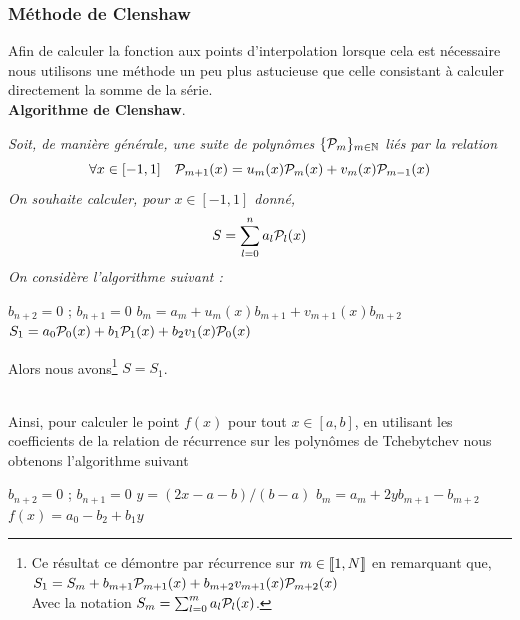 \documentclass[10pt]{article}
\begin{document}
\begin{multicols}{2}
\subsubsection{Méthode de Clenshaw}


Afin de calculer la fonction aux points d'interpolation lorsque cela est nécessaire nous utilisons une méthode un peu plus astucieuse que celle consistant à calculer directement la somme de la série. \\

\noindent
\textbf{Algorithme de Clenshaw}. {\itshape
Soit, de manière générale, une suite de polynômes $\{\mathcal{P}_m\}_{m \in \mathbb{N}}$ liés par la relation
\begin{equation}
  \forall x \in [-1, 1] \quad \mathcal{P}_{m+1}(x) = u_m(x)\mathcal{P}_m(x) + v_m(x)\mathcal{P}_{m-1}(x)
\end{equation}
On souhaite calculer, pour $x \in [-1, 1]$ donné, 
\begin{equation}
  S = \sum_{l=0}^{n} a_l \mathcal{P}_l(x)
\end{equation}
On considère l'algorithme suivant :
\vspace*{-11pt}
\begin{algorithm}[H]
  \begin{algorithmic}[1]
    \STATE $b_{n+2} = 0$ ; $b_{n+1} = 0$
    \STATE $b_m = a_m + u_m(x)b_{m+1} + v_{m+1}(x)b_{m+2}$
    \ENDFOR
    \STATE $S_1 = a_0\mathcal{P}_0(x) + b_1\mathcal{P}_1(x) + b_2v_1(x)\mathcal{P}_0(x)$
  \end{algorithmic}
\end{algorithm}
\vspace*{-11pt}
\noindent
Alors nous avons\footnote{Ce résultat ce démontre par récurrence sur $m \in  \llbracket 1,N \rrbracket $ en remarquant que,
$S_1 = S_m +  b_{m+1}\mathcal{P}_{m+1}(x) + b_{m+2}v_{m+1}(x)\mathcal{P}_{m+2}(x)$\\
Avec la notation $S_m = \sum_{l=0}^{m} a_l \mathcal{P}_l(x)$.} $S = S_1$. 
} \\

Ainsi, pour calculer le point $f(x)$ pour tout $x \in [a,b]$, en utilisant les coefficients de la relation de récurrence sur les polynômes de Tchebytchev  nous obtenons l'algorithme suivant 

\begin{algorithm}[H]
  \begin{algorithmic}[1]
    \STATE $b_{n+2} = 0$ ; $b_{n+1} = 0$
    \STATE $y = (2x-a-b)/(b-a)$
    \STATE $b_m = a_m + 2yb_{m+1} - b_{m+2}$
    \ENDFOR
    \STATE $f(x) = a_0 - b_2 + b_1y$
  \end{algorithmic}
\end{algorithm}


\end{multicols}
\end{document}
